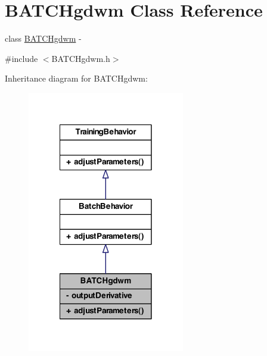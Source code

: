 \hypertarget{class_b_a_t_c_hgdwm}{
\section{BATCHgdwm Class Reference}
\label{class_b_a_t_c_hgdwm}
}


class \hyperlink{class_b_a_t_c_hgdwm}{BATCHgdwm} -\/  




{\ttfamily \#include $<$BATCHgdwm.h$>$}



Inheritance diagram for BATCHgdwm:
\nopagebreak
\begin{figure}[H]
\begin{center}
\leavevmode
\includegraphics[width=194pt]{class_b_a_t_c_hgdwm__inherit__graph}
\end{center}
\end{figure}


